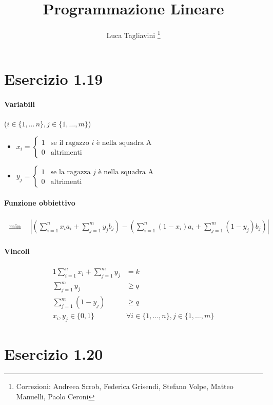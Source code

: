 \documentclass{article}
\title{Programmazione Lineare}
\author{Luca Tagliavini
  \thanks{Correzioni: Andreea Scrob, Federica Grisendi, Stefano Volpe, Matteo Manuelli, Paolo Ceroni}
}
\begin{document}
\maketitle
\pagebreak
\tableofcontents
\pagebreak
{}

\section{Esercizio 1.19}

\paragraph{Variabili} ($i \in \{1,\ldots\,n\}, j \in \{1,\ldots,m\}$)
\begin{itemize}
  \item $x_i = \begin{cases}
    1 &\text{se il ragazzo }i\text{ \`e nella squadra A}\\
    0 &\text{altrimenti}
  \end{cases}$
  \item $y_j = \begin{cases}
    1 &\text{se la ragazza }j\text{ \`e nella squadra A}\\
    0 &\text{altrimenti}
  \end{cases}$
\end{itemize}

\paragraph{Funzione obbiettivo}
\begin{align*}
  \min \quad |(\sum_{i=1}^n x_i a_i + \sum_{j=1}^m y_j b_j) - (\sum_{i=1}^n (1-x_i) a_i + \sum_{j=1}^m (1-y_j) b_j)|
\end{align*}

\paragraph{Vincoli}
\begin{alignat}{1}
  \sum_{i=1}^n x_i + \sum_{j=1}^m y_j &= k \\
  \sum_{j=1}^m y_j &\geq q \\
  \sum_{j=1}^m (1-y_j) &\geq q \\
  x_i, y_j \in \{0,1\} \qquad &\forall i \in \{1,\ldots,n\}, j \in \{1,\ldots,m\}
\end{alignat}

\pagebreak
\section{Esercizio 1.20}
\end{document}

